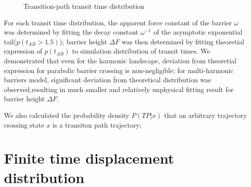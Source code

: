 \documentclass[11pt, a4paper]{article}
\begin{document}
\begin{figure}[htp]
  \noindent{}
  \caption{Transition-path transit time distribution}
  \label{fig:tpt_time}
\end{figure}

For each transit time distribution, the apparent force constant of the barrier $\omega$ was determined by fitting the decay constant $\omega^{-1}$ of the asymptotic exponential tail($p(t_{AB}>1.5)$); barrier height $\Delta F$ was
 then determined by fitting theoretial expression of $p(t_{AB})$ to simulation distribution of transit times. We demonstrated that even for the harmonic landscape, deviation from theoretial expression for parabolic barrier crossing is
 non-negligible; for multi-harmonic barriers model, significant deviation from theoretical distribution was observed,resulting in much smaller and relatively unphysical fitting result for barrier height $\Delta F$.

We also calculated the probability density $P(TP|x)$ that an arbitrary trajectory crossing state $x$ is a transiton path trajectory;

\section{Finite time displacement distribution}
\end{document}
